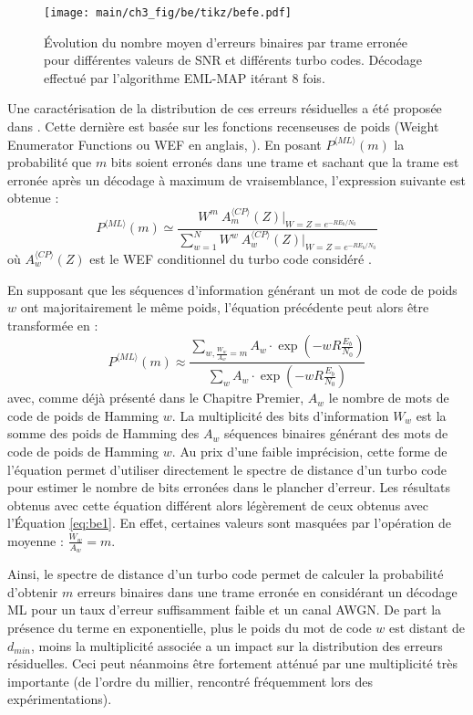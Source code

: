 \begin{figure}[!b]
	\centering
	\texttt{[image: main/ch3\_fig/be/tikz/befe.pdf]}
	\caption{Évolution du nombre moyen d'erreurs binaires par trame erronée pour différentes valeurs de SNR et différents
	turbo codes. Décodage effectué par l'algorithme EML-MAP itérant 8 fois. \label{fig:befe}}
\end{figure}

Une caractérisation de la distribution de ces erreurs 
résiduelles a été proposée dans \cite{residual_errors}. Cette dernière est basée sur les fonctions recenseuses de poids
(Weight Enumerator Functions ou WEF en anglais, \cite{ryan}). En posant $P^{\langle ML\rangle}(m)$ la probabilité que 
$m$ bits soient erronés dans une trame et sachant que la trame est erronée après un décodage à maximum de vraisemblance,
l'expression suivante est obtenue :
\begin{equation}
P^{\langle ML\rangle}(m) \simeq \frac{W^m~A_m^{\langle CP\rangle}(Z)\vert_{W=Z=e^{-RE_b/N_0}}}{\sum\limits_{w=1}^N W^w~A_w^{\langle CP\rangle}(Z) \vert_{W=Z=e^{-RE_b/N_0}}}
\label{eq:be1}
\end{equation}
où $A_w^{\langle CP\rangle}(Z)$ est le WEF conditionnel du turbo code considéré \cite{benedetto_unveiling}.

En supposant que les séquences d'information 
générant un mot de code de poids $w$ ont majoritairement le même poids, l'équation précédente peut alors être transformée 
en : 
\begin{equation}
P^{\langle ML\rangle}(m) \approx \frac{\displaystyle\sum\limits_{w, \frac{W_w}{A_w}=m} A_w\cdot \exp\left(-w R \frac{E_b}{N_0}\right)}
                  {\displaystyle\sum\limits_{w} A_w\cdot \exp\left(-w R \frac{E_b}{N_0}\right)}
\label{eq:be2}
\end{equation}
avec, comme déjà présenté dans le Chapitre Premier, $A_w$ le nombre de mots de code de poids de Hamming $w$. La 
multiplicité des bits d'information $W_w$ est la somme des poids de Hamming des $A_w$ séquences binaires générant des
mots de code de poids de Hamming $w$. Au prix d'une faible imprécision, cette forme de l'équation permet d'utiliser 
directement le spectre de distance d'un turbo code pour estimer le nombre de bits erronées dans le plancher d'erreur. Les
résultats obtenus avec cette équation différent alors légèrement de ceux obtenus avec l'Équation \ref{eq:be1}. En effet,
certaines valeurs sont masquées par l'opération de moyenne : $\frac{W_w}{A_w}=m$. 

Ainsi, le spectre de distance d'un turbo code permet de calculer la probabilité 
d'obtenir $m$ erreurs binaires dans une trame erronée en considérant un décodage ML pour un taux d'erreur suffisamment 
faible et un canal AWGN. De part la présence du terme en exponentielle, plus le poids du mot de code $w$ est distant 
de $d_{min}$, moins la multiplicité associée a un impact sur la distribution des erreurs résiduelles. Ceci peut néanmoins
être fortement atténué par une multiplicité très importante (de l'ordre du millier, rencontré fréquemment lors des 
expérimentations).


